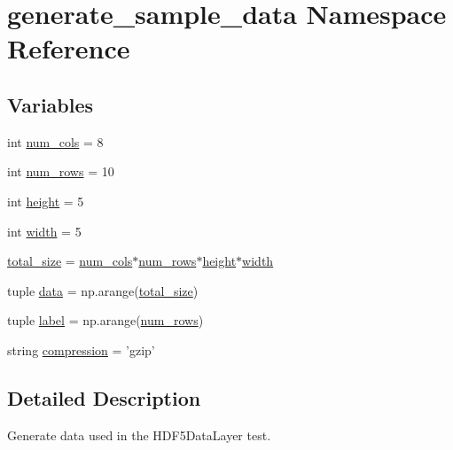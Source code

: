 \hypertarget{namespacegenerate__sample__data}{\section{generate\+\_\+sample\+\_\+data Namespace Reference}
\label{namespacegenerate__sample__data}
}
\subsection*{Variables}
\begin{DoxyCompactItemize}
\item 
int \hyperlink{namespacegenerate__sample__data_a561c187196bf47070154df3d2d75cb51}{num\+\_\+cols} = 8
\item 
int \hyperlink{namespacegenerate__sample__data_a9facebf11fedbe0a7a1bd753b543c3ee}{num\+\_\+rows} = 10
\item 
int \hyperlink{namespacegenerate__sample__data_aee9f33a4615d33e1df6895e47bcc3eee}{height} = 5
\item 
int \hyperlink{namespacegenerate__sample__data_a2264268ecd1bdb7d0617a9c36ed42939}{width} = 5
\item 
\hyperlink{namespacegenerate__sample__data_ac8b970b8c3bac43e04c22fe0a745e301}{total\+\_\+size} = \hyperlink{namespacegenerate__sample__data_a561c187196bf47070154df3d2d75cb51}{num\+\_\+cols}$\ast$\hyperlink{namespacegenerate__sample__data_a9facebf11fedbe0a7a1bd753b543c3ee}{num\+\_\+rows}$\ast$\hyperlink{namespacegenerate__sample__data_aee9f33a4615d33e1df6895e47bcc3eee}{height}$\ast$\hyperlink{namespacegenerate__sample__data_a2264268ecd1bdb7d0617a9c36ed42939}{width}
\item 
tuple \hyperlink{namespacegenerate__sample__data_a6d6f72c9c6db3bc85a15a55d7b6a4481}{data} = np.\+arange(\hyperlink{namespacegenerate__sample__data_ac8b970b8c3bac43e04c22fe0a745e301}{total\+\_\+size})
\item 
tuple \hyperlink{namespacegenerate__sample__data_ab3adb52f8cd3ca5ea300de81eec28ff2}{label} = np.\+arange(\hyperlink{namespacegenerate__sample__data_a9facebf11fedbe0a7a1bd753b543c3ee}{num\+\_\+rows})
\item 
string \hyperlink{namespacegenerate__sample__data_ae085b150f0489c2f88c614ca8ead3b10}{compression} = 'gzip'
\end{DoxyCompactItemize}


\subsection{Detailed Description}
\begin{DoxyVerb}Generate data used in the HDF5DataLayer test.
\end{DoxyVerb}
 


